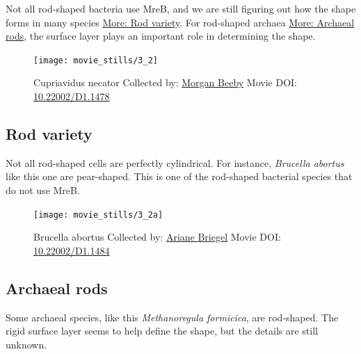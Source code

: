 \documentclass[]{tufte-book}
\begin{document}
Not all rod-shaped bacteria use MreB, and we are still figuring out how
the shape forms in many species \protect\hyperlink{Rod_variety}{More:
Rod variety}. For rod-shaped archaea
\protect\hyperlink{Archaeal_rods}{More: Archaeal rods}, the surface
layer plays an important role in determining the shape.





\begin{figure}
\texttt{[image: movie\_stills/3\_2]} \caption[Cupriavidus necator Collected by:
\protect\hyperlink{morgan_beeby}{Morgan Beeby} Movie DOI:
\href{https://doi.org/10.22002/D1.1478}{10.22002/D1.1478}]{Cupriavidus necator Collected by:
\protect\hyperlink{morgan_beeby}{Morgan Beeby} Movie DOI:
\href{https://doi.org/10.22002/D1.1478}{10.22002/D1.1478}}\label{fig:3-2}
\end{figure}

\hypertarget{Rod_variety}{\subsection{Rod variety}\label{Rod_variety}}

Not all rod-shaped cells are perfectly cylindrical. For instance,
\emph{Brucella abortus} like this one are pear-shaped. This is one of
the rod-shaped bacterial species that do not use MreB.





\begin{figure}
\texttt{[image: movie\_stills/3\_2a]} \caption[Brucella abortus Collected by:
\protect\hyperlink{ariane_briegel}{Ariane Briegel} Movie DOI:
\href{https://doi.org/10.22002/D1.1484}{10.22002/D1.1484}]{Brucella abortus Collected by:
\protect\hyperlink{ariane_briegel}{Ariane Briegel} Movie DOI:
\href{https://doi.org/10.22002/D1.1484}{10.22002/D1.1484}}\label{fig:3-2a}
\end{figure}

\hypertarget{Archaeal_rods}{\subsection{Archaeal
rods}\label{Archaeal_rods}}

Some archaeal species, like this \emph{Methanoregula formicica}, are
rod-shaped. The rigid surface layer seems to help define the shape, but
the details are still unknown.
\end{document}
